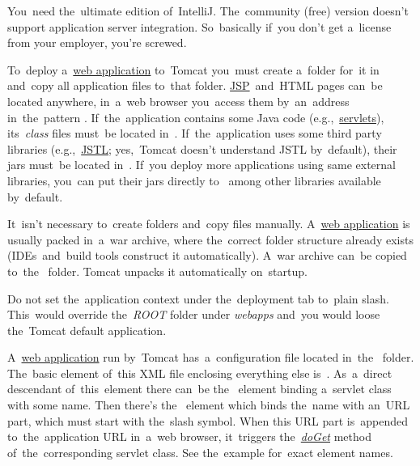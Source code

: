 \warning You~need the~ultimate edition of~IntelliJ.
The~community (free) version doesn't support application server integration.
So~basically if~you don't get a~license from your employer, you're screwed.

To~deploy a~\hyperref[webserviceapplication]{web application} to~Tomcat you~must create a~folder for~it in~ and~copy all application files to~that folder.
\hyperref[jsp]{JSP}~and~HTML pages can~be located anywhere, in~a~web browser you~access them by~an~address in~the~pattern .
If~the~application contains some Java code (e.g.,~\hyperref[servlet]{servlets}), its~\textit{class} files must~be located in~.
If~the~application uses some third party libraries (e.g.,~\hyperref[jstl]{JSTL}; yes,~Tomcat doesn't understand JSTL by~default), their jars must~be located in~.
If~you deploy more applications using same external libraries, you~can put their jars directly to~ among other libraries available by~default.

It~isn't necessary to~create folders and~copy files manually. A~\hyperref[webserviceapplication]{web application} is usually packed in~a~war archive, where the~correct folder structure already exists (IDEs~and~build tools construct it automatically). A~war archive can~be copied to~the~ folder. Tomcat unpacks it automatically on~startup.


\warning Do not set the~application context under the~deployment tab to~plain slash. This~would override the~\textit{ROOT} folder under \textit{webapps} and~you would loose the~Tomcat default application.

\label{servleturl}
A~\hyperref[webserviceapplication]{web application} run by~Tomcat has~a~configuration file  located in~the~ folder. The~basic element of~this XML file enclosing everything else is~. As~a~direct descendant of~this~element there can~be the~ element binding a~servlet class with some name. Then there's the~ element which binds the~name with an~URL part, which must start with the~slash symbol. When this URL part is~appended to~the~application URL in~a~web browser, it~triggers the~\hyperref[servicedopostdoget]{\textit{doGet}} method of~the~corresponding servlet class. See the~example for~exact element names.

